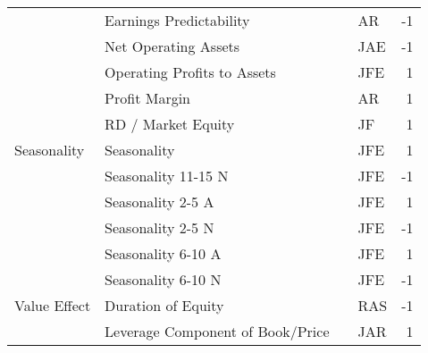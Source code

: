 \begin{tabular}{llllr}
             & Earnings Predictability &            \cite{francis2004costs} &      AR &    -1 \\
             & Net Operating Assets &    \cite{hirshleifer2004investors} &     JAE &    -1 \\
             & Operating Profits to Assets &            \cite{ball2016accruals} &     JFE &     1 \\
             & Profit Margin &              \cite{soliman2008use} &      AR &     1 \\
             & RD / Market Equity &               \cite{chan2001stock} &      JF &     1 \\
Seasonality & Seasonality &       \cite{heston2008seasonality} &     JFE &     1 \\
             & Seasonality 11-15 N &       \cite{heston2008seasonality} &     JFE &    -1 \\
             & Seasonality 2-5 A &       \cite{heston2008seasonality} &     JFE &     1 \\
             & Seasonality 2-5 N &       \cite{heston2008seasonality} &     JFE &    -1 \\
             & Seasonality 6-10 A &       \cite{heston2008seasonality} &     JFE &     1 \\
             & Seasonality 6-10 N &       \cite{heston2008seasonality} &     JFE &    -1 \\
Value Effect & Duration of Equity &           \cite{dechow2004implied} &     RAS &    -1 \\
             & Leverage Component of Book/Price &              \cite{penman2007book} &     JAR &     1 \\
\bottomrule
\end{tabular}
